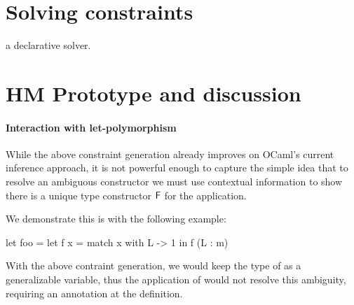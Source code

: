 \documentclass[acmsmall,screen,nonacm]{acmart}
\begin{document}
\section{Solving constraints}
\label{sec:solving}

\TODO
{a declarative solver.}












\section{HM Prototype and discussion}
\label{sec:implementation}





\paragraph{Interaction with let-polymorphism}


While the above constraint generation already improves on
OCaml's current inference approach, it is not powerful enough to capture the
simple idea that to resolve an ambiguous constructor we must use contextual
information to show there is a unique type constructor $\mathrel{\mathsf{F}}\mathclose{}$ for the
application.

We demonstrate this is with the following example:
\begin{program}
let foo =
  let f x = match x with L -> 1 in
  f (L : m)
\end{program}
With the above contraint generation, we would keep the type of 
as a generalizable variable, thus the application of  would not
resolve this ambiguity, requiring an annotation at the definition.
\end{document}
